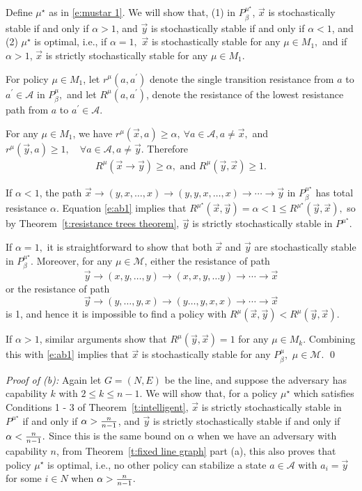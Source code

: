 Define $\mu^\star$ as in \eqref{e:mustar 1}. We will show that, (1) in $P^{\mu^\star}_\beta$, $\vec{x}$ is stochastically stable if and only if $\alpha >1$, and $ \vec{y}$ is stochastically stable if and only if $\alpha<1$, and (2) $\mu^\star$ is optimal, i.e., if $\alpha = 1,$ $\vec{x}$ is stochastically stable for any $\mu\in M_1,$ and if $\alpha >1$, $\vec{x}$ is strictly stochastically stable for any $\mu\in M_1.$

For policy $\mu\in M_1$, let $r^{\mu}(a,a^\prime)$ denote the single transition resistance from $a$ to $a^\prime\in \mathcal{A}$ in $P^\mu_\beta,$ and let $R^\mu(a,a^\prime)$, denote the resistance of the lowest resistance path from $a$ to $a^\prime\in \mathcal{A}$. 

For any $\mu\in M_1$, we have
$r^\mu(\vec{x}, a)\geq \alpha,\ \forall a\in\mathcal{A},a\neq \vec{x},$ and
$r^\mu( \vec{y}, a) \geq 1,\quad\forall a\in\mathcal{A}, a\neq  \vec{y}.$
Therefore
\begin{align}
R^\mu(\vec{x}\to \vec{y})\geq\alpha,\text{ and }R^\mu ( \vec{y},\vec{x})\geq 1\label{e:ab1}.%
\end{align}

If $\alpha <1$, the path
$\vec{x}\to(y,x,\ldots,x)\to (y,y,x,\ldots,x)\to\cdots\to  \vec{y}$
in $P^{\mu^\star}_\beta$ has total resistance $\alpha$. Equation \eqref{e:ab1} implies that
$R^{\mu^\star}(\vec{x}, \vec{y})  = \alpha < 1 \leq R^{\mu^\star}( \vec{y},\vec{x}),$
so by Theorem~\ref{t:resistance trees theorem}, $ \vec{y}$ is strictly stochastically stable in $P^{\mu^\star}.$

If $\alpha = 1,$ it is straightforward to show that both $\vec{x}$ and $ \vec{y}$ are stochastically stable in $P^{\mu^\star}_\beta$. Moreover, for any $\mu\in\mathcal{M}$, either the resistance of path 
$$ \vec{y}\to (x,y,\ldots,y)\to (x,x,y,\ldots y)\to\cdots\to \vec{x}$$
or the resistance of path 
$$ \vec{y}\to (y,\ldots,y,x)\to (y\ldots,y,x,x)\to\cdots\to \vec{x}$$
is 1, and hence it is impossible to find a policy with $R^\mu(\vec{x}, \vec{y}) < R^\mu( \vec{y},\vec{x}).$

If $\alpha >1$, similar arguments show that $R^\mu( \vec{y},\vec{x}) = 1$ for any $\mu\in M_k.$ Combining this with \eqref{e:ab1} implies that $\vec{x}$ is stochastically stable for any $P^\mu_\beta,$ $\mu\in\mathcal{M}$.
\hfill\qed

\noindent\emph{Proof of (b):}
Again let $G = (N,E)$ be the line, and suppose the adversary has capability $k$ with $2\leq k\leq n-1.$ We will show that, for a policy $\mu^\star$ which satisfies Conditions 1 - 3 of Theorem~\ref{t:intelligent}, $\vec{x}$ is strictly stochastically stable in $P^{\mu^\star}$ if and only if $\alpha > {n\over n-1}$, and $ \vec{y}$ is strictly stochastically stable if and only if $\alpha < {n\over n-1}.$ Since this is the same bound on $\alpha$ when we have an adversary with capability $n$, from Theorem~\ref{t:fixed line graph} part (a), this also proves that policy $\mu^\star$ is optimal, i.e., no other policy can stabilize a state $a\in \mathcal{A}$ with $a_i =  \vec{y}$ for some $i\in N$ when $\alpha > {n\over n-1}.$


